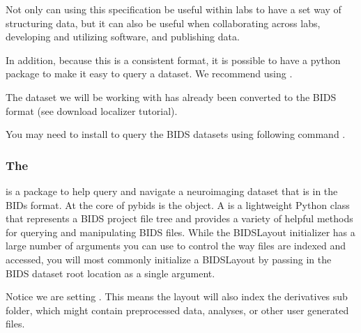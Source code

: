 \documentclass[letterpaper,10pt,english]{sphinxmanual}
\begin{document}
Not only can using this specification be useful within labs to have a set way of structuring data, but it can also be useful when collaborating across labs, developing and utilizing software, and publishing data.

In addition, because this is a consistent format, it is possible to have a python package to make it easy to query a dataset. We recommend using .

The dataset we will be working with has already been converted to the BIDS format (see download localizer tutorial).

You may need to install  to query the BIDS datasets using following command .


\subsubsection{The }
\label{\detokenize{content/Introduction_to_Neuroimaging_Data:the-bidslayout}}
 is a package to help query and navigate a neuroimaging dataset that is in the BIDs format. At the core of pybids is the  object. A  is a lightweight Python class that represents a BIDS project file tree and provides a variety of helpful methods for querying and manipulating BIDS files. While the BIDSLayout initializer has a large number of arguments you can use to control the way files are indexed and accessed, you will most commonly initialize a BIDSLayout by passing in the BIDS dataset root location as a single argument.

Notice we are setting . This means the layout will also index the derivatives sub folder, which might contain preprocessed data, analyses, or other user generated files.

\begin{sphinxVerbatim}[commandchars=\\\{\}]
    
 

  
   
\end{sphinxVerbatim}
\end{document}
